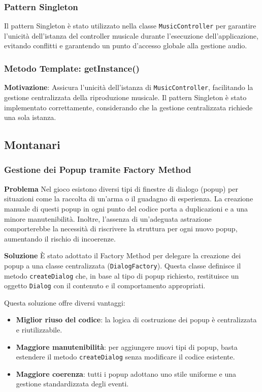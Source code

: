 \documentclass[a4paper,12pt]{report}
\begin{document}
\subsubsection{Pattern Singleton}
Il pattern Singleton è stato utilizzato nella classe \texttt{MusicController} per garantire l'unicità dell'istanza del controller musicale durante l'esecuzione dell'applicazione, evitando conflitti e garantendo un punto d'accesso globale alla gestione audio.

\subsubsection{Metodo Template: getInstance()}
\textbf{Motivazione}: Assicura l'unicità dell'istanza di \texttt{MusicController}, facilitando la gestione centralizzata della riproduzione musicale. Il pattern Singleton è stato implementato correttamente, considerando che la gestione centralizzata richiede una sola istanza.

\subsection{Montanari}
\subsubsection{Gestione dei Popup tramite Factory Method}

\textbf{Problema}\newline
Nel gioco esistono diversi tipi di finestre di dialogo (popup) per situazioni come la raccolta di un'arma o il guadagno di esperienza. La creazione manuale di questi popup in ogni punto del codice porta a duplicazioni e a una minore manutenibilità. Inoltre, l'assenza di un'adeguata astrazione comporterebbe la necessità di riscrivere la struttura per ogni nuovo popup, aumentando il rischio di incoerenze.
  
\textbf{Soluzione}\newline
È stato adottato il Factory Method per delegare la creazione dei popup a una classe centralizzata (\texttt{DialogFactory}). Questa classe definisce il metodo \texttt{createDialog} che, in base al tipo di popup richiesto, restituisce un oggetto \texttt{Dialog} con il contenuto e il comportamento appropriati.

Questa soluzione offre diversi vantaggi:
\begin{itemize}
\item \textbf{Miglior riuso del codice}: la logica di costruzione dei popup è centralizzata e riutilizzabile.
\item \textbf{Maggiore manutenibilità}: per aggiungere nuovi tipi di popup, basta estendere il metodo \texttt{createDialog} senza modificare il codice esistente.
\item \textbf{Maggiore coerenza}: tutti i popup adottano uno stile uniforme e una gestione standardizzata degli eventi.
\end{itemize}
\end{document}
